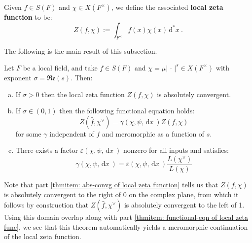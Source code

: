 \documentclass[11pt, x11names, openany]{book}
\newcommand{\abs}[1]{\left| \, #1  \,\right|}
\renewcommand{\hat}{\widehat}
\newcommand{\re}[1]{\mathfrak{Re} \left( #1 \right)}
\newcommand{\dx}{\, \mathrm{d}x \ }
\renewcommand{\d}[1]{\, \mathrm{d}#1 \ }
\begin{document}
\begin{defn}
\label{def: local zeta function}
    Given $f \in S(F)$ and $\chi \in X(F^\times)$, we define the associated \textbf{local zeta function} to be:
    \begin{equation*}
        Z(f, \chi) := \int_{F^\times} f(x)\chi(x)\d{^*x}.
    \end{equation*} 
\end{defn}

The following is the main result of this subsection.

\begin{theorem}
\label{thm: local zeta function convergence and func-eqn}
    Let $F$ be a local field, and take  $f \in S(F)$ and $\chi = \mu \abs{\cdot}^s \in X(F^\times)$ with exponent $\sigma = \re{s}$. Then:
    \begin{enumerate}[(a)]
        \item \label{thmitem: abs-convg of local zeta function} If $\sigma > 0$ then the local zeta function $Z(f, \chi)$ is absolutely convergent.
        \item \label{thmitem: functional-eqn of local zeta func} If $\sigma \in (0, 1)$ then the following functional equation holds:
        \begin{equation*}
            Z(\hat{f}, \chi^\lor) = \gamma(\chi, \psi, \dx) Z(f, \chi)
        \end{equation*}
        for some $\gamma$ independent of $f$ and meromorphic as a function of $s$.
        \item \label{thmitem: epsilon factor local-zeta-func}There exists a factor $\varepsilon(\chi, \psi, \dx)$ nonzero for all inputs and satisfies:
        \begin{equation*}
            \gamma(\chi, \psi, \dx ) = \varepsilon(\chi, \psi, \dx) \frac{L(\chi^\lor)}{L(\chi)}
        \end{equation*}
    \end{enumerate} 
\end{theorem}

\begin{observation}
Note that part \ref{thmitem: abs-convg of local zeta function} tells us that $Z(f, \chi)$ is absolutely convergent to the right of 0 on the complex plane, from which it follows by construction that $Z(\hat{f}, \chi^\lor)$ is absolutely convergent to the left of 1. Using this domain overlap along with part \ref{thmitem: functional-eqn of local zeta func}, we see that this theorem automatically yields a meromorphic continuation of the local zeta function. 
\end{observation}
\end{document}
